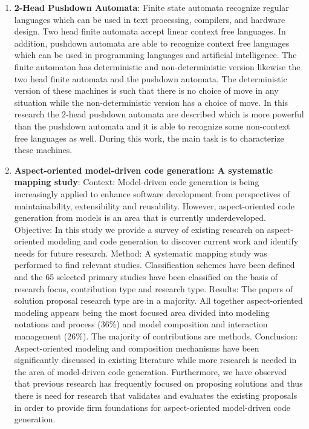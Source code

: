 \begin{englishtext}
\begin{enumerate}
    \item \textbf{2-Head Pushdown Automata}: Finite state automata recognize
    regular languages which can be used in text processing, compilers, and
    hardware design. Two head finite automata accept linear context free
    languages. In addition, pushdown automata are able to recognize context free
    languages which can be used in programming languages and artificial
    intelligence. The finite automaton has deterministic and non-deterministic
    version likewise the two head finite automata and the pushdown automata. The
    deterministic version of these machines is such that there is no choice of
    move in any situation while the non-deterministic version has a choice of
    move. In this research the 2-head pushdown automata are described which is
    more powerful than the pushdown automata and it is able to recognize some
    non-context free languages as well. During this work, the main task is to
    characterize these machines. \cite{pushdownAutomata}

    \item \textbf{Aspect-oriented model-driven code generation: A systematic
    mapping study}: Context: Model-driven code generation is being increasingly
    applied to enhance software development from perspectives of
    maintainability, extensibility and reusability. However, aspect-oriented
    code generation from models is an area that is currently underdeveloped.
    Objective: In this study we provide a survey of existing research on
    aspect-oriented modeling and code generation to discover current work and
    identify needs for future research. Method: A systematic mapping study was
    performed to find relevant studies. Classification schemes have been defined
    and the 65 selected primary studies have been classified on the basis of
    research focus, contribution type and research type. Results: The papers of
    solution proposal research type are in a majority. All together
    aspect-oriented modeling appears being the most focused area divided into
    modeling notations and process (36\%) and model composition and interaction
    management (26\%). The majority of contributions are methods. Conclusion:
    Aspect-oriented modeling and composition mechanisms have been significantly
    discussed in existing literature while more research is needed in the area
    of model-driven code generation. Furthermore, we have observed that previous
    research has frequently focused on proposing solutions and thus there is
    need for research that validates and evaluates the existing proposals in
    order to provide firm foundations for aspect-oriented model-driven code
    generation. \cite{aspectOriented}


\end{enumerate}
\end{englishtext}
